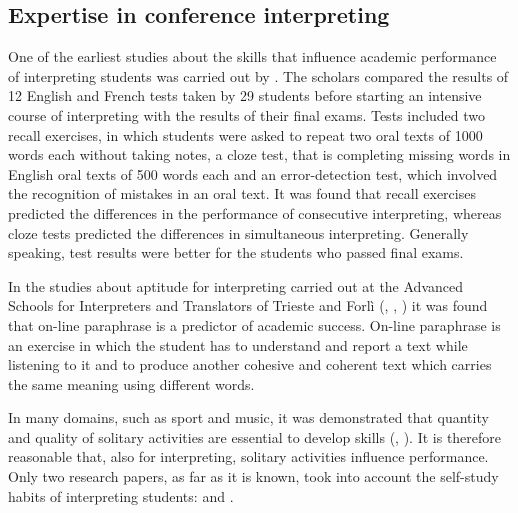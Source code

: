 \documentclass[output=paper]{../langscibook}
\begin{document}
\subsection{Expertise in conference interpreting}
\label{sec:ghiselli:2.2}


One of the earliest studies about the skills that influence academic performance of interpreting students was carried out by \citet{GerverEtAl1984}. The scholars compared the results of 12 English and French tests taken by 29 students before starting an intensive course of interpreting with the results of their final exams. Tests included two recall exercises, in which students were asked to repeat two oral texts of 1000 words each without taking notes, a cloze test, that is completing missing words in English oral texts of 500 words each and an error-detection test, which involved the recognition of mistakes in an oral text. It was found that recall exercises predicted the differences in the performance of consecutive interpreting, whereas cloze tests predicted the differences in simultaneous interpreting. Generally speaking, test results were better for the students who passed final exams.

In the studies about aptitude for interpreting carried out at the Advanced Schools for Interpreters and Translators of Trieste and Forlì (\citealt{PippaRusso2002}, \citealt{RussoPippa2004}, \citealt{Russo2014}) it was found that on-line paraphrase is a predictor of academic success. On-line paraphrase is an exercise in which the student has to understand and report a text while listening to it and to produce another cohesive and coherent text which carries the same meaning using different words.

In many domains, such as sport and music, it was demonstrated that quantity and quality of solitary activities are essential to develop skills (\citealt{Ericsson1996,Ericsson2001,Ericsson2002}, \citealt{HelsenEtAl1998}). It is therefore reasonable that, also for interpreting, solitary activities influence performance. Only two research papers, as far as it is known, took into account the self-study habits of interpreting students: \citet{Fan2012} and \citet{Wang2016}.
\end{document}
